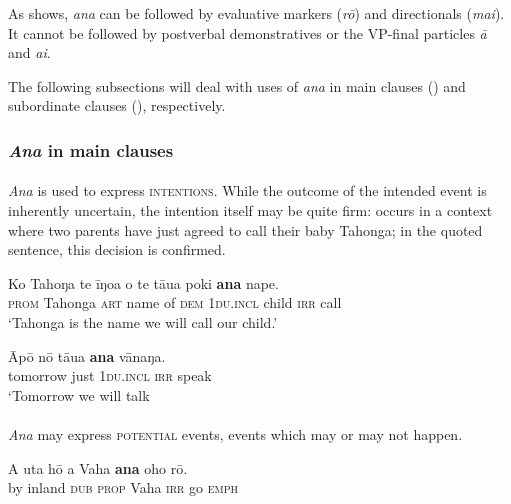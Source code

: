 As  shows, \textit{ana} can be followed by evaluative markers (\textit{rō}) and directionals (\textit{mai}). It cannot be followed by postverbal demonstratives or the VP{}-final particles \textit{{\ꞌ}ā} and \textit{{\ꞌ}ai}.

The following subsections will deal with uses of \textit{ana} in main clauses () and subordinate clauses (), respectively.

\subsubsection{\textit{Ana} in main clauses}\label{sec:11.5.2.1}

\paragraph{} \textit{Ana} is used to express \textsc{intentions}. While the outcome of the intended event is inherently uncertain, the intention itself may be quite firm:  occurs in a context where two parents have just agreed to call their baby Tahonga; in the quoted sentence, this decision is confirmed.

\ea\label{ex:11.165}
\gll Ko Tahoŋa te {\ꞌ}īŋoa o te tāua poki \textbf{ana} nape. \\
\textsc{prom} Tahonga \textsc{art} name of \textsc{dem} \textsc{1du.incl} child \textsc{irr} call \\

\glt 
‘Tahonga is the name we will call our child.’ \textstyleExampleref{[R301.146]} 
\z

\ea\label{ex:11.166}
\gll Āpō nō tāua \textbf{ana} vānaŋa. \\
tomorrow just \textsc{1du.incl} \textsc{irr} speak \\

\glt 
‘Tomorrow we will talk 
\z

\paragraph{} \textit{Ana} may express \textsc{potential} events, events which may or may not happen.

\ea\label{ex:11.167}
\gll A {\ꞌ}uta hō a Vaha \textbf{ana} oho rō. \\
by inland \textsc{dub} \textsc{prop} Vaha \textsc{irr} go \textsc{emph} \\

